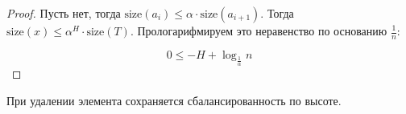 \begin{proof}
	Пусть нет, тогда $\text{size} (a_i) \le \alpha \cdot \text{size} (a_{i+1})$. Тогда $\text{size} (x) \le \alpha^H \cdot \text{size} (T)$. Прологарифмируем это неравенство по основанию $\frac{1}{n}$:

	\begin{equation*}
		0 \le -H + \log_{\frac{1}{\alpha}} n		
	\end{equation*}
\end{proof}

\begin{theorem}
	При удалении элемента сохраняется сбалансированность по высоте.
 \end{theorem}

